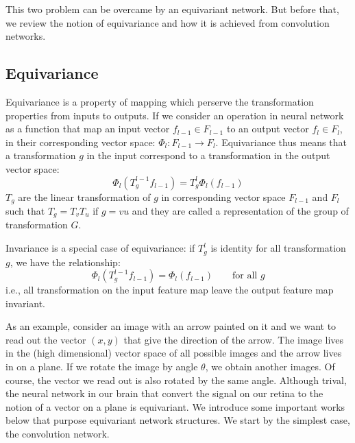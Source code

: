 \documentclass{IEEEtran}
\begin{document}
This two problem can be overcame by an equivariant network. 
But before that, we review the notion of equivariance and how it is achieved from convolution networks.

\subsection{Equivariance}
Equivariance is a property of mapping which perserve the transformation properties from inputs 
to outputs. If we consider an operation in neural network as a function that map an input vector 
$f_{l-1}\in F_{l-1}$ to an output vector $f_l \in F_l$, in their corresponding vector space: 
$\Phi_l\colon F_{l-1} \to F_{l}$. Equivariance thus means that a transformation $g$ in the input 
correspond to a transformation in the output vector space:
\begin{equation}
    \Phi_l (T^{l-1}_g f_{l-1}) = T^l_g \Phi_l (f_{l-1}) \label{E:equivariant_condition}
\end{equation}
$T_g$ are the linear transformation of $g$ in corresponding vector space $F_{l-1}$ and $F_l$ such that 
$T_{g} = T_v T_u$ if $g = vu$ and they are called a representation of the group of transformation $G$.

Invariance is a special case of equivariance: if $T^l_g$ is identity for all transformation $g$, we 
have the relationship:
\begin{equation}
    \Phi_l (T^{l-1}_g f_{l-1}) = \Phi_l (f_{l-1})\qquad \text{for all $g$} \label{E:invariant_condition}
\end{equation}
i.e., all transformation on the input feature map leave the output feature map invariant.

As an example, consider an image with an arrow painted on it and we want to read out the vector $(x,y)$ 
that give the direction of the arrow. The image lives in the (high dimensional) vector space of 
all possible images and the arrow lives in on a plane. If we rotate the image by angle $\theta$, we 
obtain another images. Of course, the vector we read out is also rotated by the same angle. Although 
trival, the neural network in our brain that convert the signal on our retina to the notion of a vector on 
a plane is equivariant. We introduce some important works below that purpose equivariant network structures. 
We start by the simplest case, the convolution network. 
\end{document}
